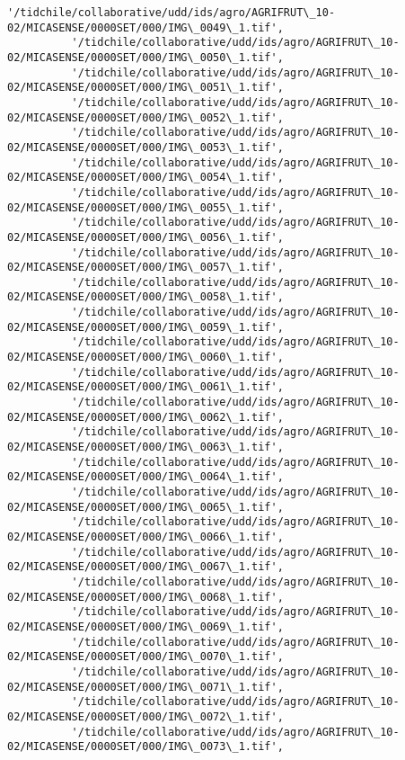 \documentclass[11pt]{article}
\begin{document}
\begin{Verbatim}[commandchars=\\\{\}]
          '/tidchile/collaborative/udd/ids/agro/AGRIFRUT\_10-02/MICASENSE/0000SET/000/IMG\_0049\_1.tif',
          '/tidchile/collaborative/udd/ids/agro/AGRIFRUT\_10-02/MICASENSE/0000SET/000/IMG\_0050\_1.tif',
          '/tidchile/collaborative/udd/ids/agro/AGRIFRUT\_10-02/MICASENSE/0000SET/000/IMG\_0051\_1.tif',
          '/tidchile/collaborative/udd/ids/agro/AGRIFRUT\_10-02/MICASENSE/0000SET/000/IMG\_0052\_1.tif',
          '/tidchile/collaborative/udd/ids/agro/AGRIFRUT\_10-02/MICASENSE/0000SET/000/IMG\_0053\_1.tif',
          '/tidchile/collaborative/udd/ids/agro/AGRIFRUT\_10-02/MICASENSE/0000SET/000/IMG\_0054\_1.tif',
          '/tidchile/collaborative/udd/ids/agro/AGRIFRUT\_10-02/MICASENSE/0000SET/000/IMG\_0055\_1.tif',
          '/tidchile/collaborative/udd/ids/agro/AGRIFRUT\_10-02/MICASENSE/0000SET/000/IMG\_0056\_1.tif',
          '/tidchile/collaborative/udd/ids/agro/AGRIFRUT\_10-02/MICASENSE/0000SET/000/IMG\_0057\_1.tif',
          '/tidchile/collaborative/udd/ids/agro/AGRIFRUT\_10-02/MICASENSE/0000SET/000/IMG\_0058\_1.tif',
          '/tidchile/collaborative/udd/ids/agro/AGRIFRUT\_10-02/MICASENSE/0000SET/000/IMG\_0059\_1.tif',
          '/tidchile/collaborative/udd/ids/agro/AGRIFRUT\_10-02/MICASENSE/0000SET/000/IMG\_0060\_1.tif',
          '/tidchile/collaborative/udd/ids/agro/AGRIFRUT\_10-02/MICASENSE/0000SET/000/IMG\_0061\_1.tif',
          '/tidchile/collaborative/udd/ids/agro/AGRIFRUT\_10-02/MICASENSE/0000SET/000/IMG\_0062\_1.tif',
          '/tidchile/collaborative/udd/ids/agro/AGRIFRUT\_10-02/MICASENSE/0000SET/000/IMG\_0063\_1.tif',
          '/tidchile/collaborative/udd/ids/agro/AGRIFRUT\_10-02/MICASENSE/0000SET/000/IMG\_0064\_1.tif',
          '/tidchile/collaborative/udd/ids/agro/AGRIFRUT\_10-02/MICASENSE/0000SET/000/IMG\_0065\_1.tif',
          '/tidchile/collaborative/udd/ids/agro/AGRIFRUT\_10-02/MICASENSE/0000SET/000/IMG\_0066\_1.tif',
          '/tidchile/collaborative/udd/ids/agro/AGRIFRUT\_10-02/MICASENSE/0000SET/000/IMG\_0067\_1.tif',
          '/tidchile/collaborative/udd/ids/agro/AGRIFRUT\_10-02/MICASENSE/0000SET/000/IMG\_0068\_1.tif',
          '/tidchile/collaborative/udd/ids/agro/AGRIFRUT\_10-02/MICASENSE/0000SET/000/IMG\_0069\_1.tif',
          '/tidchile/collaborative/udd/ids/agro/AGRIFRUT\_10-02/MICASENSE/0000SET/000/IMG\_0070\_1.tif',
          '/tidchile/collaborative/udd/ids/agro/AGRIFRUT\_10-02/MICASENSE/0000SET/000/IMG\_0071\_1.tif',
          '/tidchile/collaborative/udd/ids/agro/AGRIFRUT\_10-02/MICASENSE/0000SET/000/IMG\_0072\_1.tif',
          '/tidchile/collaborative/udd/ids/agro/AGRIFRUT\_10-02/MICASENSE/0000SET/000/IMG\_0073\_1.tif',

\end{Verbatim}
\end{document}
